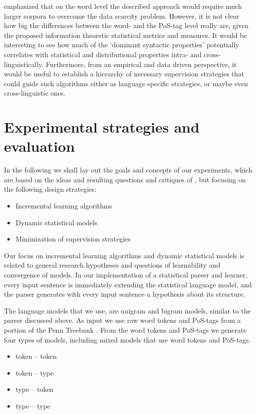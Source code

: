 \documentclass[11pt,a4paper,english]{article}
\begin{document}
\cite{Magerman:Marcus:1990} emphasized that on the word level the described approach would require much larger corpora to overcome the data scarcity problem. However, it is not clear how big the differences between the word- and the PoS-tag level really are, given the proposed information theoretic statistical metrics and measures. It would be interesting to see how much of the `dominant syntactic properties' potentially correlates with statistical and distributional properties intra- and cross-linguistically. Furthermore, from an empirical and data driven perspective, it would be useful to establish a hierarchy of necessary supervision strategies that could guide such algorithms either as language specific strategies, or maybe even cross-linguistic ones.


\section{Experimental strategies and evaluation}

In the following we shall lay out the goals and concepts of our experiments, which are based on the ideas and resulting questions and critiques of \cite{Magerman:Marcus:1990}, but focusing on the following design strategies:

\begin{itemize}
\item Incremental learning algorithms
\item Dynamic statistical models
\item Minimization of supervision strategies
\end{itemize}

Our focus on incremental learning algorithms and dynamic statistical models is related to general research hypotheses and questions of learnability and convergence of models. In our implementation of a statistical parser and learner, every input sentence is immediately extending the statistical language model, and the parser generates with every input sentence a hypothesis about its structure.

The language models that we use, are unigram and bigram models, similar to the parser discussed above. As input we use raw word tokens and PoS-tags from a portion of the Penn Treebank \citep{Marcus:ea:1993}. From the word tokens and PoS-tags we generate four types of models, including mixed models that use word tokens and PoS-tags.

\begin{itemize}
\item token -- token
\item token -- type
\item type -- token
\item type -- type
\end{itemize}
\end{document}
